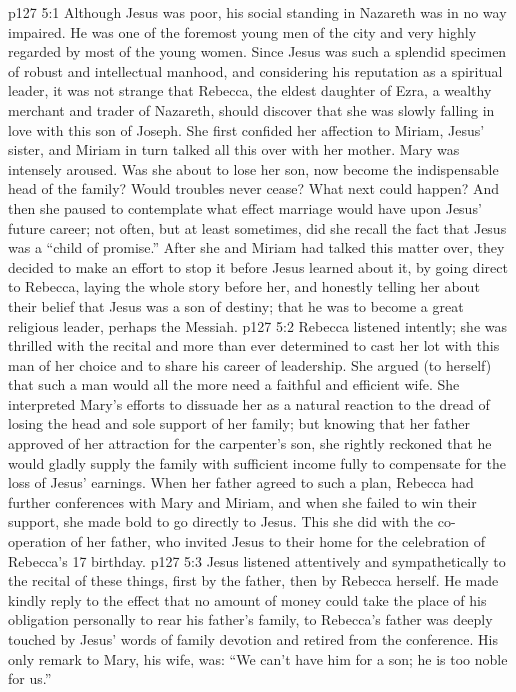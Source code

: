 \vs p127 5:1 Although Jesus was poor, his social standing in Nazareth was in no way impaired. He was one of the foremost young men of the city and very highly regarded by most of the young women. Since Jesus was such a splendid specimen of robust and intellectual manhood, and considering his reputation as a spiritual leader, it was not strange that Rebecca, the eldest daughter of Ezra, a wealthy merchant and trader of Nazareth, should discover that she was slowly falling in love with this son of Joseph. She first confided her affection to Miriam, Jesus’ sister, and Miriam in turn talked all this over with her mother. Mary was intensely aroused. Was she about to lose her son, now become the indispensable head of the family? Would troubles never cease? What next could happen? And then she paused to contemplate what effect marriage would have upon Jesus’ future career; not often, but at least sometimes, did she recall the fact that Jesus was a “child of promise.” After she and Miriam had talked this matter over, they decided to make an effort to stop it before Jesus learned about it, by going direct to Rebecca, laying the whole story before her, and honestly telling her about their belief that Jesus was a son of destiny; that he was to become a great religious leader, perhaps the Messiah.
\vs p127 5:2 Rebecca listened intently; she was thrilled with the recital and more than ever determined to cast her lot with this man of her choice and to share his career of leadership. She argued (to herself) that such a man would all the more need a faithful and efficient wife. She interpreted Mary’s efforts to dissuade her as a natural reaction to the dread of losing the head and sole support of her family; but knowing that her father approved of her attraction for the carpenter’s son, she rightly reckoned that he would gladly supply the family with sufficient income fully to compensate for the loss of Jesus’ earnings. When her father agreed to such a plan, Rebecca had further conferences with Mary and Miriam, and when she failed to win their support, she made bold to go directly to Jesus. This she did with the co\hyp{}operation of her father, who invited Jesus to their home for the celebration of Rebecca’s 17 birthday.
\vs p127 5:3 Jesus listened attentively and sympathetically to the recital of these things, first by the father, then by Rebecca herself. He made kindly reply to the effect that no amount of money could take the place of his obligation personally to rear his father’s family, to  Rebecca’s father was deeply touched by Jesus’ words of family devotion and retired from the conference. His only remark to Mary, his wife, was: “We can’t have him for a son; he is too noble for us.”
